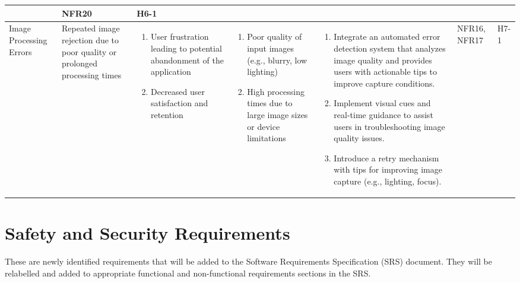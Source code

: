 \documentclass{article}
\begin{document}
\begin{landscape}
\begin{longtable}{|p{3cm}|p{4cm}|p{5cm}|p{5cm}|p{5cm}|p{1cm}|p{0.75cm}|}
\begin{enumerate}[label=(\alph*), leftmargin=0.5cm]
    \end{enumerate} &
    NFR20 &
    H6-1 \\
    \hline
    Image Processing Errors &
    Repeated image rejection due to poor quality or prolonged processing times &
    \begin{enumerate}[label=(\alph*), leftmargin=0.5cm]
        \item User frustration leading to potential abandonment of the application
        \item Decreased user satisfaction and retention
    \end{enumerate} &
    \begin{enumerate}[label=(\alph*), leftmargin=0.5cm]
        \item Poor quality of input images (e.g., blurry, low lighting)
        \item High processing times due to large image sizes or device limitations
    \end{enumerate} &
    \begin{enumerate}[label=(\alph*), leftmargin=0.5cm]
        \item Integrate an automated error detection system that analyzes image quality and provides users with actionable tips to improve capture conditions.
        \item Implement visual cues and real-time guidance to assist users in troubleshooting image quality issues.
        \item Introduce a retry mechanism with tips for improving image capture (e.g., lighting, focus).
    \end{enumerate} &
    NFR16, NFR17 &
    H7-1 \\
\end{longtable}
    \newpage{}
\end{landscape}
\restoregeometry

\section{Safety and Security Requirements}

These are newly identified requirements that will be added to the Software
Requirements Specification (SRS) document. They will be relabelled and added to
appropriate functional and non-functional requirements sections in the SRS.
\end{document}
